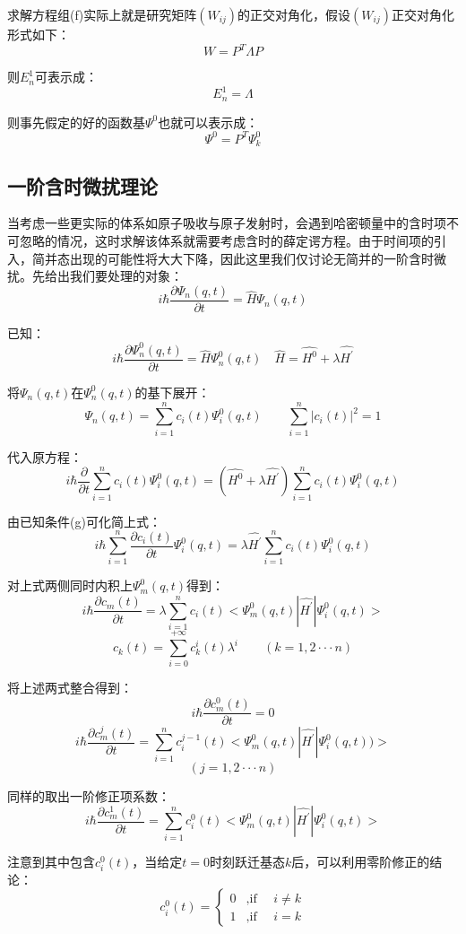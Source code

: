 求解方程组(f)实际上就是研究矩阵$(W_{ij})$的正交对角化，假设$(W_{ij})$正交对角化形式如下：
\[W=P^T \Lambda P\]

则$E_n^1$可表示成：
\[E_n^1=\Lambda\]

则事先假定的好的函数基$\varPsi^0$也就可以表示成：
\[\varPsi^0=P^T \varPsi^0_k\]

\subsection{一阶含时微扰理论}
当考虑一些更实际的体系如原子吸收与原子发射时，会遇到哈密顿量中的含时项不可忽略的情况，这时求解该体系就需要考虑含时的薛定谔方程。由于时间项的引入，简并态出现的可能性将大大下降，因此这里我们仅讨论无简并的一阶含时微扰。先给出我们要处理的对象：
\[i \hbar \frac{\partial \varPsi_n(q,t)}{\partial t}=\hat{H} \varPsi_n(q,t)\]

已知：
\[i \hbar \frac{\partial \varPsi_n^0(q,t)}{\partial t}=\hat{H} \varPsi_n^0(q,t)\quad \hat{H}=\hat{H^0}+\lambda\hat{H^{'}}\tag{g}\]

将$\varPsi_n(q,t)$在$\varPsi_n^0(q,t)$的基下展开：
\[\varPsi_n(q,t)=\sum_{i=1}^nc_i(t)\varPsi_i^0(q,t) \qquad \sum_{i=1}^n|c_i(t)|^2=1\]

代入原方程：
\[i \hbar \frac{\partial}{\partial t}\sum_{i=1}^nc_i(t)\varPsi_i^0(q,t)=(\hat{H^0}+\lambda\hat{H^{'}}) \sum_{i=1}^nc_i(t)\varPsi_i^0(q,t)\]

由已知条件(g)可化简上式：
\[i \hbar \sum_{i=1}^n\frac{\partial c_i(t)}{\partial t}\varPsi_i^0(q,t)=\lambda\hat{H^{'}} \sum_{i=1}^nc_i(t)\varPsi_i^0(q,t)\]

对上式两侧同时内积上$\varPsi_m^0(q,t)$得到：
\[i \hbar \frac{\partial c_m(t)}{\partial t}=\lambda\sum_{i=1}^nc_i(t)<\varPsi_m^0(q,t)|\hat{H^{'}}|\varPsi_i^0(q,t)>\]
\[c_k(t)=\sum_{i=0}^{+\infty}c_k^i(t)\lambda^i \qquad (k=1,2 \cdot\cdot\cdot n)\]

将上述两式整合得到：
\[i \hbar \frac{\partial c_m^0(t)}{\partial t}=0\]
\[i \hbar \frac{\partial c_m^j(t)}{\partial t}=\sum_{i=1}^nc_i^{j-1}(t)<\varPsi_m^0(q,t)|\hat{H^{'}}|\varPsi_i^0(q,t))>\]
\[(j=1,2 \cdot\cdot\cdot n)\]

同样的取出一阶修正项系数：
\[i \hbar \frac{\partial c_m^1(t)}{\partial t}=\sum_{i=1}^nc_i^0(t)<\varPsi_m^0(q,t)|\hat{H^{'}}|\varPsi_i^0(q,t)> \tag{h}\]

注意到其中包含$c_i^0(t)$，当给定$t=0$时刻跃迁基态$k$后，可以利用零阶修正的结论：
\[c_i^0(t) = \left\{
\begin{array}{rl}
0 & \text{,if  }\quad i \neq k\\
1 & \text{,if  }\quad i=k
\end{array} \right. \]

